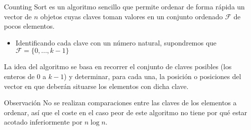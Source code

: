\documentclass{beamer}
\begin{document}
\begin{frame}
\alert{Counting Sort} es un algoritmo sencillo que permite ordenar de  forma rápida un vector de $n$ objetos cuyas claves toman valores en un conjunto ordenado $\mathcal{F}$ de pocos elementos.
\begin{itemize}
	\item Identificando cada clave con un número natural, supondremos que $\mathcal{F}= \{0,...,k-1\}$ 
\end{itemize}

La idea del algoritmo se basa en recorrer el conjunto de claves posibles (los enteros de $0$ a $k-1$) y determinar, para cada una, la posición o posiciones del vector en que deberán situarse los elementos con dicha clave.
\begin{block}{Observación} 
No se realizan comparaciones entre las claves de los elementos a ordenar, así que el coste en el caso peor de este algoritmo no tiene por qué estar acotado inferiormente por $n \log n$. 
\end{block}

\end{frame}
\end{document}
